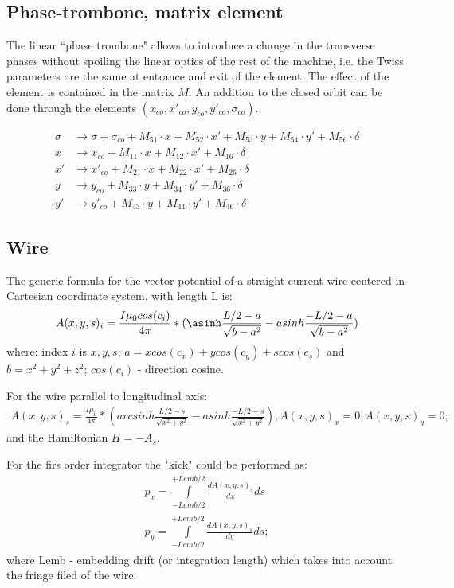 \documentclass[english]{article}
\begin{document}
\subsection{Phase-trombone, matrix element}
The linear ``phase trombone" allows to introduce a change in the transverse phases 
without spoiling the linear optics of the rest of the machine, i.e. the Twiss 
parameters are the same at entrance and exit of the element. The effect of the element 
is contained in the matrix $M$. An addition to the closed orbit can be done through the
elements $(x_{co},x'_{co},y_{co},y'_{co},\sigma_{co})$.

\begin{align}
    \sigma & \to \sigma + \sigma_{co} + M_{51}\cdot x + M_{52}\cdot x' 
    + M_{53}\cdot y + M_{54}\cdot y' + M_{56}\cdot\delta \\
    x & \to x_{co} + M_{11}\cdot x + M_{12}\cdot x' + M_{16}\cdot\delta \\
    x' & \to x'_{co} + M_{21}\cdot x + M_{22}\cdot x' + M_{26}\cdot\delta \\
    y & \to y_{co} + M_{33}\cdot y + M_{34}\cdot y' + M_{36}\cdot\delta \\
    y' & \to y'_{co} + M_{43}\cdot y + M_{44}\cdot y' + M_{46}\cdot\delta
\end{align}

\subsection{Wire}
The generic formula for the vector potential of a straight current wire centered in Cartesian coordinate system, with length L is:  
\begin{align}
{A(x,y,s)_i} =\frac{I\mu_0cos(c_i)}{4\pi}*(\asinh\frac{L/2-a}{\sqrt{b-a^2}}-asinh\frac{-L/2-a}{\sqrt{b-a^2}})
\end{align}
where:
index $i$ is $x,y,s$; ${a=xcos(c_x)+ycos(c_y)+scos(c_s)}$ and ${b=x^2+y^2+z^2}$; $cos(c_i)$ - direction cosine.

For the wire parallel to longitudinal axis:
\begin{align}
{A(x,y,s)_s} =\frac{I\mu_0}{4\pi}*(arcsinh\frac{L/2-s}{\sqrt{x^2+y^2}}-asinh\frac{-L/2-s}{\sqrt{x^2+y^2}}), {A(x,y,s)_x}=0, {A(x,y,s)_y}=0;
\end{align}  
and the Hamiltonian $H=-A_s$. 

For the firs order integrator the "kick" could be performed as:
\begin{align}
p_x=\int\limits_{-L{emb}/2}^{+L{emb}/2}{\frac{dA(x,y,s)_s}{dx}ds} \\
p_y=\int\limits_{-L{emb}/2}^{+L{emb}/2}{\frac{dA(x,y,s)_s}{dy}ds};
\end{align}
where Lemb - embedding drift (or integration length) which takes into account the fringe filed of the wire.
\end{document}
